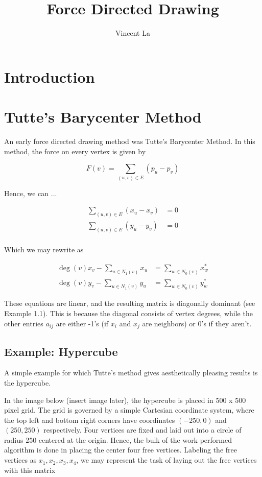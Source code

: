 \documentclass[11pt]{article}
\title{Force Directed Drawing}
\author{Vincent La}
\begin{document}
\maketitle

\section{Introduction}


\section{Tutte's Barycenter Method}
An early force directed drawing method was Tutte's Barycenter Method. In this method, the force on every vertex is given by 

\[ F(v) = \sum_{(u, v) \in E} (p_u - p_v) \]

Hence, we can ...

\[
\begin{aligned}
    \sum_{(u, v) \in E} (x_u - x_v) &= 0 \\
    \sum_{(u, v) \in E} (y_u - y_v) &= 0 \\
\end{aligned}
\]

Which we may rewrite as

\[
\begin{aligned}
    \deg{(v)}x_v - \sum_{u \in N_1(v)} x_u &= \sum_{w \in N_0(v)} x^*_w \\
    \deg{(v)}y_v - \sum_{u \in N_1(v)} y_u &= \sum_{w \in N_0(v)} y^*_w
\end{aligned}
\]

These equations are linear, and the resulting matrix is diagonally dominant (see Example 1.1). This is because the diagonal consists of vertex degrees, while the other entries $a_{ij}$ are either -1's (if $x_i$ and $x_j$ are neighbors) or 0's if they aren't.

\subsection{Example: Hypercube}
A simple example for which Tutte's method gives aesthetically pleasing results is the hypercube.

\bigskip

In the image below (insert image later), the hypercube is placed in 500 x 500 pixel grid. The grid is governed by a simple Cartesian coordinate system, where the top left and bottom right corners have coordinates $(-250, 0)$ and $(250, 250)$ respectively. Four vertices are fixed and laid out into a circle of radius 250 centered at the origin. Hence, the bulk of the work performed algorithm is done in placing the center four free vertices. Labeling the free vertices as $x_1, x_2, x_3, x_4$, we may represent the task of laying out the free vertices with this matrix
\end{document}
